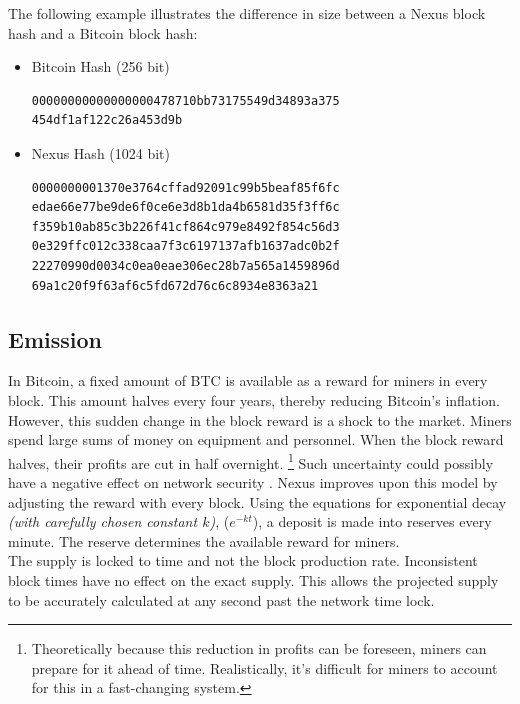 \documentclass[11pt]{article}
\begin{document}
The following example illustrates the difference in size between a Nexus block hash and a Bitcoin block hash:

\begin{itemize}
\item Bitcoin Hash (256 bit)
\begin{lstlisting}
00000000000000000478710bb73175549d34893a375
454df1af122c26a453d9b
\end{lstlisting}

\item Nexus Hash (1024 bit)

\begin{lstlisting}
0000000001370e3764cffad92091c99b5beaf85f6fc
edae66e77be9de6f0ce6e3d8b1da4b6581d35f3ff6c
f359b10ab85c3b226f41cf864c979e8492f854c56d3
0e329ffc012c338caa7f3c6197137afb1637adc0b2f
22270990d0034c0ea0eae306ec28b7a565a1459896d
69a1c20f9f63af6c5fd672d76c6c8934e8363a21
\end{lstlisting}
\end{itemize}


\pagebreak
\subsection{Emission}

In Bitcoin, a fixed amount of BTC is available as a reward for miners in every block.
This amount halves every four years, thereby reducing Bitcoin's inflation.
However, this sudden change in the block reward is a shock to the market.
Miners spend large sums of money on equipment and personnel.
When the block reward halves, their profits are cut in half overnight.
\footnote{Theoretically because this reduction in profits can be foreseen, miners can prepare for it ahead of time.
Realistically, it's difficult for miners to account for this in a fast-changing system.}
Such uncertainty could possibly have a negative effect on network security \cite{cdhalving}.
\noindent Nexus improves upon this model by adjusting the reward with every block.
Using the equations for exponential decay \textit{(with carefully chosen constant $k$)}, ($e^{-kt}$), 
a deposit is made into reserves every minute.
The reserve determines the available reward for miners.\\ 

\noindent The supply is locked to time and not the block production rate. 
Inconsistent block times have no effect on the exact supply. 
This allows the projected supply to be accurately calculated at any second past the network time lock.
\end{document}
